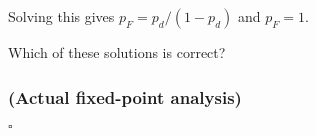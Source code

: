 
Solving this gives $p_F = p_d / (1 - p_d)$ and $p_F = 1$. 

Which of these solutions is correct? 





\subsubsection{(Actual fixed-point analysis)}



$\square$




